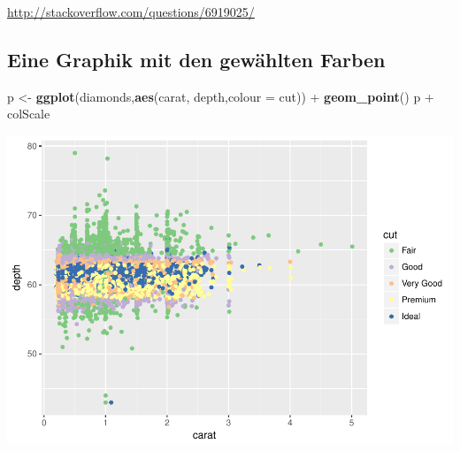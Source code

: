 \documentclass[]{article}
\newenvironment{Shaded}{\begin{snugshade}}{\end{snugshade}}
\newcommand{\KeywordTok}[1]{\textcolor[rgb]{0.13,0.29,0.53}{\textbf{{#1}}}}
\newcommand{\DataTypeTok}[1]{\textcolor[rgb]{0.13,0.29,0.53}{{#1}}}
\newcommand{\DecValTok}[1]{\textcolor[rgb]{0.00,0.00,0.81}{{#1}}}
\newcommand{\StringTok}[1]{\textcolor[rgb]{0.31,0.60,0.02}{{#1}}}
\newcommand{\NormalTok}[1]{{#1}}
\begin{document}
\begin{Shaded}
\end{Shaded}

\url{http://stackoverflow.com/questions/6919025/}

\subsection{Eine Graphik mit den gewählten
Farben}\label{eine-graphik-mit-den-gewahlten-farben}

\begin{Shaded}
\begin{Highlighting}[]
\NormalTok{p <-}\StringTok{ }\KeywordTok{ggplot}\NormalTok{(diamonds,}\KeywordTok{aes}\NormalTok{(carat, depth,}\DataTypeTok{colour =} \NormalTok{cut)) +}\StringTok{ }
\StringTok{  }\KeywordTok{geom_point}\NormalTok{()}
\NormalTok{p +}\StringTok{ }\NormalTok{colScale}
\end{Highlighting}
\end{Shaded}

\includegraphics{Intro_Datenanalyse1_files/figure-latex/unnamed-chunk-231-1.pdf}
\end{document}
